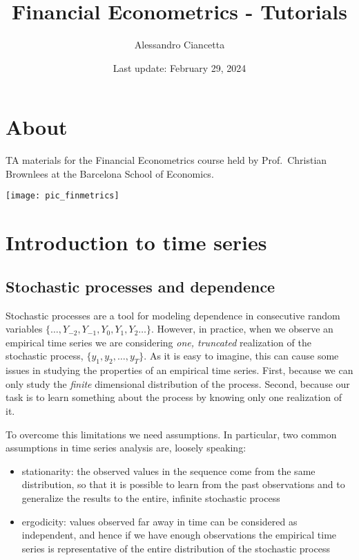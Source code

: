 \documentclass[
]{book}
\title{Financial Econometrics - Tutorials}
\author{Alessandro Ciancetta}
\date{Last update: February 29, 2024}
\begin{document}
\maketitle

{
\setcounter{tocdepth}{1}
\tableofcontents
}
\hypertarget{about}{%
\chapter*{About}\label{about}}

TA materials for the Financial Econometrics course held by Prof.~Christian Brownlees at the Barcelona School of Economics.

\begin{center}\texttt{[image: pic\_finmetrics]} \end{center}

\hypertarget{session01}{%
\chapter{Introduction to time series}\label{session01}}

\hypertarget{stochastic-processes-and-dependence}{%
\section{Stochastic processes and dependence}\label{stochastic-processes-and-dependence}}

Stochastic processes are a tool for modeling dependence in consecutive random variables \(\{\dots, Y_{-2}, Y_{-1}, Y_{0}, Y_{1}, Y_{2} \dots\}\). However, in practice, when we observe an empirical time series we are considering \emph{one, truncated} realization of the stochastic process, \(\{y_1, y_2, \dots, y_T\}\). As it is easy to imagine, this can cause some issues in studying the properties of an empirical time series. First, because we can only study the \emph{finite} dimensional distribution of the process. Second, because our task is to learn something about the process by knowing only one realization of it.

To overcome this limitations we need assumptions. In particular, two common assumptions in time series analysis are, loosely speaking:

\begin{itemize}
\item
  stationarity: the observed values in the sequence come from the same distribution, so that it is possible to learn from the past observations and to generalize the results to the entire, infinite stochastic process
\item
  ergodicity: values observed far away in time can be considered as independent, and hence if we have enough observations the empirical time series is representative of the entire distribution of the stochastic process
\end{itemize}
\end{document}
